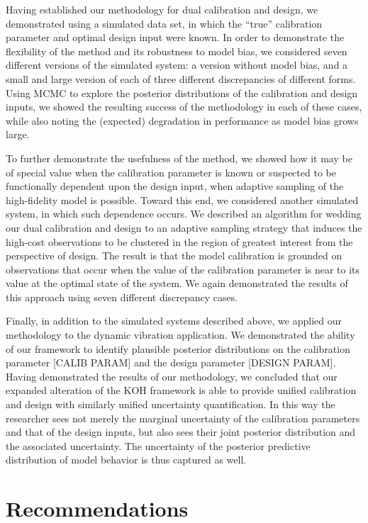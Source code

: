 \documentclass[10pt,a4paper]{article}
\begin{document}
Having established our methodology for dual calibration and design, we demonstrated using a simulated data set, in which the ``true'' calibration parameter and optimal design input were known.
In order to demonstrate the flexibility of the method and its robustness to model bias, we considered seven different versions of the simulated system: a version without model bias, and a small and large version of each of three different discrepancies of different forms.
Using MCMC to explore the posterior distributions of the calibration and design inputs, we showed the resulting success of the methodology in each of these cases, while also noting the (expected) degradation in performance as model bias grows large.

To further demonstrate the usefulness of the method, we showed how it may be of special value when the calibration parameter is known or suspected to be functionally dependent upon the design input, when adaptive sampling of the high-fidelity model is possible.
Toward this end, we considered another simulated system, in which such dependence occurs.
We described an algorithm for wedding our dual calibration and design to an adaptive sampling strategy that induces the high-cost observations to be clustered in the region of greatest interest from the perspective of design.
The result is that the model calibration is grounded on observations that occur when the value of the calibration parameter is near to its value at the optimal state of the system.
We again demonstrated the results of this approach using seven different discrepancy cases.

Finally, in addition to the simulated systems described above, we applied our methodology to the dynamic vibration application.
We demonstrated the ability of our framework to identify plausible posterior distributions on the calibration parameter [CALIB PARAM] and the design parameter [DESIGN PARAM].
Having demonstrated the results of our methodology, we concluded that our expanded alteration of the KOH framework is able to provide unified calibration and design with similarly unified uncertainty quantification.
In this way the researcher sees not merely the marginal uncertainty of the calibration parameters and that of the design inputs, but also sees their joint posterior distribution and the associated uncertainty.
The uncertainty of the posterior predictive distribution of model behavior is thus captured as well.


\section{Recommendations}
\end{document}

